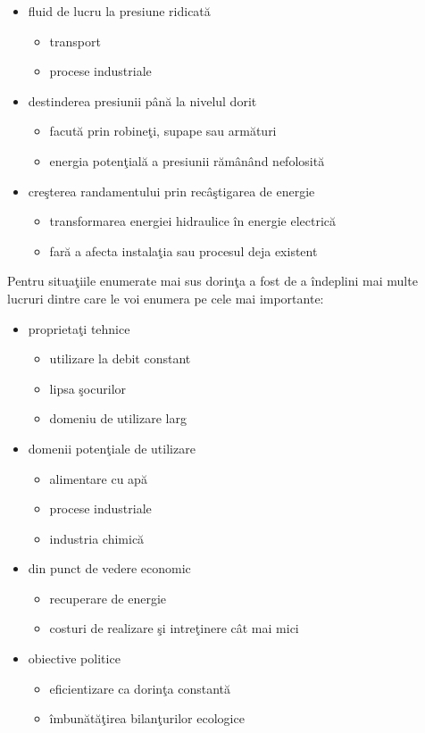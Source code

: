 \begin{itemize}
	\item fluid de lucru la presiune ridicat\u{a}
		\begin{itemize}
			\item transport
			\item procese industriale
		\end{itemize}
	\item destinderea presiunii p\^{a}n\u{a} la nivelul dorit
		\begin{itemize}
			\item facut\u{a} prin robine\c{t}i, supape sau arm\u{a}turi
			\item energia poten\c{t}ial\u{a} a presiunii r\u{a}m\^{a}n\^{a}nd nefolosit\u{a}
		\end{itemize}
	\item cre\c{s}terea randamentului prin rec\^{a}\c{s}tigarea de energie
		\begin{itemize}
			\item transformarea energiei hidraulice \^{i}n energie electric\u{a}
			\item far\u{a} a afecta instala\c{t}ia sau procesul deja existent
		\end{itemize}	
\end{itemize}

Pentru situa\c{t}iile enumerate mai sus dorin\c{t}a a fost de a \^{i}ndeplini mai multe lucruri dintre care le voi enumera pe cele mai importante:

\begin{itemize}
	\item proprieta\c{t}i tehnice
		\begin{itemize}
			\item utilizare la debit constant
			\item lipsa \c{s}ocurilor
			\item domeniu de utilizare larg
		\end{itemize}
	\item domenii poten\c{t}iale de utilizare
		\begin{itemize}
			\item alimentare cu ap\u{a}
			\item procese industriale
			\item industria chimic\u{a}
		\end{itemize}
	\item din punct de vedere economic
		\begin{itemize}
			\item recuperare de energie
			\item costuri de realizare \c{s}i intre\c{t}inere c\^{a}t mai mici
		\end{itemize}
	\item obiective politice
		\begin{itemize}
			\item eficientizare ca dorin\c{t}a constant\u{a}
			\item \^{i}mbun\u{a}t\u{a}\c{t}irea bilan\c{t}urilor ecologice
		\end{itemize}	
\end{itemize}

